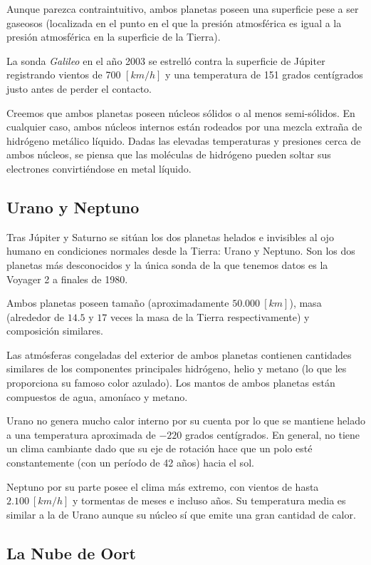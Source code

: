 \documentclass{tufte-handout}
\begin{document}
Aunque parezca contraintuitivo, ambos planetas poseen una superficie pese a ser gaseosos (localizada en el punto en el que la presión atmosférica es igual a la presión atmosférica en la superficie de la Tierra).

La sonda \emph{Galileo} en el año 2003 se estrelló contra la superficie de Júpiter registrando vientos de 700 $[km/h]$ y una temperatura de 151 grados centígrados justo antes de perder el contacto.

Creemos que ambos planetas poseen núcleos sólidos o al menos semi-sólidos. En cualquier caso, ambos núcleos internos están rodeados por una mezcla extraña de hidrógeno metálico líquido. Dadas las elevadas temperaturas y presiones cerca de ambos núcleos, se piensa que las moléculas de hidrógeno pueden soltar sus electrones convirtiéndose en metal líquido.

\subsection{Urano y Neptuno}

Tras Júpiter y Saturno se sitúan los dos planetas helados e invisibles al ojo humano en condiciones normales desde la Tierra: Urano y Neptuno. Son los dos planetas más desconocidos y la única sonda de la que tenemos datos es la Voyager 2 a finales de 1980.

Ambos planetas poseen tamaño (aproximadamente $50.000~[km]$), masa (alrededor de $14.5$ y $17$ veces la masa de la Tierra respectivamente) y composición similares.

Las atmósferas congeladas del exterior de ambos planetas contienen cantidades similares de los componentes principales hidrógeno, helio y metano (lo que les proporciona su famoso color azulado). Los mantos de ambos planetas están compuestos de agua, amoníaco y metano.

Urano no genera mucho calor interno por su cuenta por lo que se mantiene helado a una temperatura aproximada de $-220$ grados centígrados. En general, no tiene un clima cambiante dado que su eje de rotación hace que un polo esté constantemente (con un período de 42 años) hacia el sol.

Neptuno por su parte posee el clima más extremo, con vientos de hasta $2.100~[km/h]$ y tormentas de meses e incluso años. Su temperatura media es similar a la de Urano aunque su núcleo sí que emite una gran cantidad de calor.

\subsection{La Nube de Oort}
\end{document}
